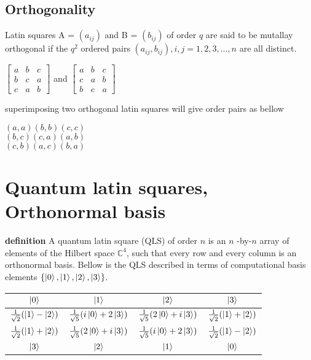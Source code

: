 \documentclass[a4paper, 12pt]{article}
\begin{document}
\subsection{Orthogonality}
Latin squares A = $(a_{ij})$ and B = $(b_{ij})$ of order $q$ are said to be mutallay orthogonal
if the $q^2$ ordered pairs $(a_{ij}, b_{ij}), i,j = 1,2,3,...,n$ are all distinct. 
\begin{center}
\begin{math}
\begin{bmatrix}
  a & b & c\\
  b & c & a\\
  c & a & b
\end{bmatrix}
\end{math}
\noindent and
\begin{math}
\begin{bmatrix}
  a & b & c\\
  c & a & b\\
  b & c & a
\end{bmatrix}
\end{math} \\
\end{center}
superimposing two orthogonal latin squares will give order pairs as bellow
\begin{center}
$(a,a) (b,b) (c,c)$\\ $(b,c) (c,a) (a,b)$\\ $(c,b) (a,c) (b,a)$ \\
\end{center}
\section{Quantum latin squares, Orthonormal basis}
\newcommand{\C}{\mathbb{C}}
\textbf{definition} A quantum latin square (QLS) of order $n$ is an $n$ -by-$n$ array of elements of the
Hilbert space \( \C^4 \), such that every row and every column is an orthonormal basis.
Bellow is the QLS described in terms of computational basis 
elements $\{ \ket{0}, \ket{1}, \ket{2}, \ket{3} \}$.
\begin{center}
\begin{tabular}{||c|c|c|c||}
  \hline
  $\ket{0}$ & $\ket{1}$ & $\ket{2}$ & $\ket{3}$ \\
  \hline
  $\frac{1}{\sqrt{2}}(\ket{1}-\ket{2})$ & $\frac{1}{\sqrt{5}}(i\ket{0}+2\ket{3})$ & $\frac{1}{\sqrt{5}}(2\ket{0}+i\ket{3})$ & $\frac{1}{\sqrt{2}}(\ket{1}+\ket{2})$\\
  \hline
  $\frac{1}{\sqrt{2}}(\ket{1}+\ket{2})$ & $\frac{1}{\sqrt{5}}(2\ket{0}+i\ket{3})$ & $\frac{1}{\sqrt{5}}(i\ket{0}+2\ket{3})$ & $\frac{1}{\sqrt{2}}(\ket{1}-\ket{2})$\\
  \hline
  $\ket{3}$ & $\ket{2}$ & $\ket{1}$ & $\ket{0}$\\ 
  \hline
\end{tabular}
\end{center}
\end{document}
